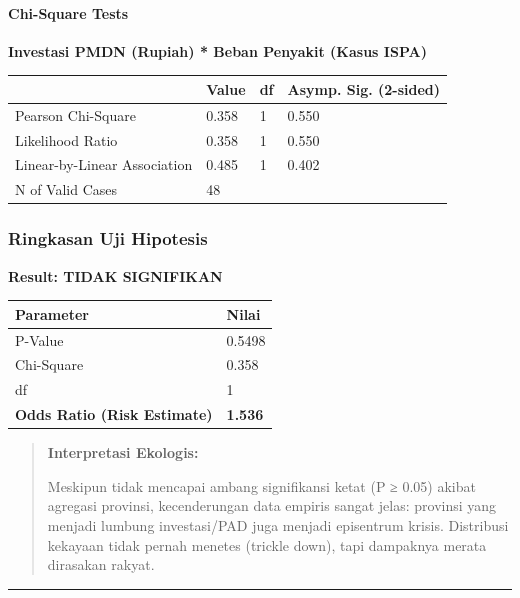 \documentclass[
]{article}
\newcounter{none} %
\begin{document}
\paragraph{Chi-Square Tests}\label{chi-square-tests}

\textbf{Investasi PMDN (Rupiah) * Beban Penyakit (Kasus ISPA)}

{\def\LTcaptype{none} %
\begin{longtable}[]{@{}llll@{}}
\toprule\noalign{}
& Value & df & Asymp. Sig. (2-sided) \\
\midrule\noalign{}
\endhead
\bottomrule\noalign{}
\endlastfoot
Pearson Chi-Square & 0.358 & 1 & 0.550 \\
Likelihood Ratio & 0.358 & 1 & 0.550 \\
Linear-by-Linear Association & 0.485 & 1 & 0.402 \\
N of Valid Cases & 48 & & \\
\end{longtable}
}

\subsubsection{Ringkasan Uji Hipotesis}\label{ringkasan-uji-hipotesis}

\textbf{Result: TIDAK SIGNIFIKAN}

{\def\LTcaptype{none} %
\begin{longtable}[]{@{}ll@{}}
\toprule\noalign{}
Parameter & Nilai \\
\midrule\noalign{}
\endhead
\bottomrule\noalign{}
\endlastfoot
P-Value & 0.5498 \\
Chi-Square & 0.358 \\
df & 1 \\
\textbf{Odds Ratio (Risk Estimate)} & \textbf{1.536} \\
\end{longtable}
}

\begin{quote}
\textbf{Interpretasi Ekologis:}

Meskipun tidak mencapai ambang signifikansi ketat (P ≥ 0.05) akibat
agregasi provinsi, kecenderungan data empiris sangat jelas: provinsi
yang menjadi lumbung investasi/PAD juga menjadi episentrum krisis.
Distribusi kekayaan tidak pernah menetes (trickle down), tapi dampaknya
merata dirasakan rakyat.
\end{quote}

\begin{center}\rule{0.5\linewidth}{0.5pt}\end{center}
\end{document}

